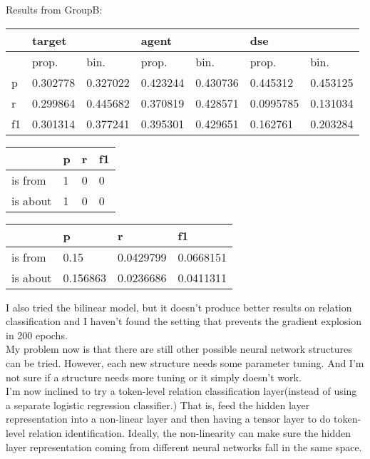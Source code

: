 \documentclass[a4paper, 12pt]{article}
\begin{document}
Results from GroupB:\\
\begin{table}[h!]
\centering
{}

\begin{tabular}{l|ll|ll|ll}
\hline
   & \multicolumn{2}{l}{target} & \multicolumn{2}{l}{agent} & \multicolumn{2}{l}{dse} \\ \hline
   & prop.& bin.& prop.& bin.& prop.& bin.\\
 \hline
p  &0.302778&0.327022& 0.423244 & 0.430736& 0.445312  & 0.453125  \\
r  &0.299864&0.445682& 0.370819 & 0.428571&0.0995785  & 0.131034  \\
f1 &0.301314&0.377241& 0.395301 & 0.429651& 0.162761  & 0.203284  \\ \hline
\end{tabular}

\centering
{}

\begin{tabular}{l|l|l|l}
\hline
         & p & r & f1    \\\hline
is from  & 1 & 0 & 0\\
is about & 1 & 0 & 0 \\
\hline
\end{tabular}


\begin{tabular}{l|l|l|l}
\hline
         & p & r & f1    \\\hline
is from  & 0.15& 0.0429799& 0.0668151 \\
is about &0.156863& 0.0236686& 0.0411311\\
\hline
\end{tabular}

\end{table}
I also tried the bilinear model, but it doesn't produce better results on
relation classification and I haven't found the setting that prevents the
gradient explosion in 200 epochs.\\
My problem now is that there are still other possible neural network structures
can be tried. However, each new structure needs some parameter tuning. And I'm
not sure if a structure needs more tuning or it simply doesn't work.\\
I'm now inclined to try a token-level relation classification layer(instead of
using a separate logistic regression classifier.) That is, feed the hidden
layer representation into a non-linear layer and then having a tensor layer to
do token-level relation identification. Ideally, the non-linearity can make sure
the hidden layer representation coming from different neural networks fall in
the same space.
\end{document}
